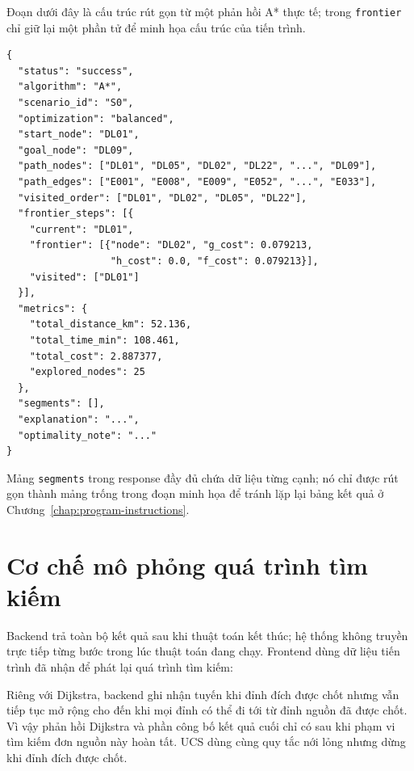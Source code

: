 Đoạn dưới đây là cấu trúc rút gọn từ một phản hồi A* thực tế; trong
\texttt{frontier} chỉ giữ lại một phần tử để minh họa cấu trúc của tiến trình.

\begin{verbatim}
{
  "status": "success",
  "algorithm": "A*",
  "scenario_id": "S0",
  "optimization": "balanced",
  "start_node": "DL01",
  "goal_node": "DL09",
  "path_nodes": ["DL01", "DL05", "DL02", "DL22", "...", "DL09"],
  "path_edges": ["E001", "E008", "E009", "E052", "...", "E033"],
  "visited_order": ["DL01", "DL02", "DL05", "DL22"],
  "frontier_steps": [{
    "current": "DL01",
    "frontier": [{"node": "DL02", "g_cost": 0.079213,
                  "h_cost": 0.0, "f_cost": 0.079213}],
    "visited": ["DL01"]
  }],
  "metrics": {
    "total_distance_km": 52.136,
    "total_time_min": 108.461,
    "total_cost": 2.887377,
    "explored_nodes": 25
  },
  "segments": [],
  "explanation": "...",
  "optimality_note": "..."
}
\end{verbatim}

Mảng \texttt{segments} trong response đầy đủ chứa dữ liệu từng cạnh; nó chỉ
được rút gọn thành mảng trống trong đoạn minh họa để tránh lặp lại bảng kết quả
ở Chương~\ref{chap:program-instructions}.

\section{Cơ chế mô phỏng quá trình tìm kiếm}

Backend trả toàn bộ kết quả sau khi thuật toán kết thúc; hệ thống không truyền
trực tiếp từng bước trong lúc thuật toán đang chạy. Frontend dùng dữ liệu tiến trình
đã nhận để phát lại quá trình tìm kiếm:

Riêng với Dijkstra, backend ghi nhận tuyến khi đỉnh đích được chốt nhưng vẫn
tiếp tục mở rộng cho đến khi mọi đỉnh có thể đi tới từ đỉnh nguồn đã được chốt.
Vì vậy phản hồi Dijkstra và phần công bố kết quả cuối chỉ có sau khi phạm vi tìm
kiếm đơn nguồn này hoàn tất. UCS dùng cùng quy tắc nới lỏng nhưng dừng khi đỉnh
đích được chốt.

